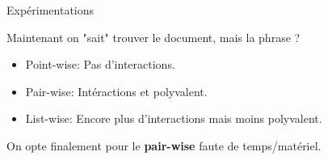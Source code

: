 \documentclass{beamer}
\begin{document}
\begin{frame}{Expérimentations}
    \begin{block}{Maintenant on "sait" trouver le document, mais la phrase ?}
        \begin{itemize}
            \item Point-wise: Pas d'interactions.
            \item Pair-wise: Intéractions et polyvalent.
            \item List-wise: Encore plus d'interactions 
            mais moins polyvalent.
        \end{itemize}
        
        On opte finalement pour le \textbf{pair-wise} faute de temps/matériel.
        
    \end{block}
\end{frame}
\end{document}
